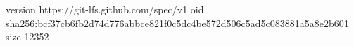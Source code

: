 version https://git-lfs.github.com/spec/v1
oid sha256:bcf37cb6fb2d74d776abbce821f0c5dc4be572d506c5ad5c083881a5a8e2b601
size 12352
